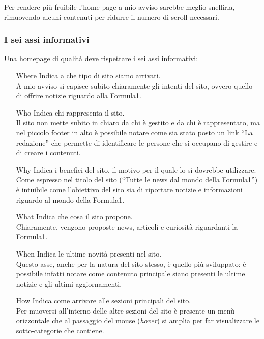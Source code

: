 Per rendere più fruibile l'home page a mio avviso sarebbe meglio snellirla,
rimuovendo alcuni contenuti per ridurre il numero di scroll necessari.

\subsubsection{I sei assi informativi}

Una homepage di qualit\`a deve rispettare i sei assi informativi:
\begin{itemize}

\item[Where] Indica a che tipo di sito siamo arrivati. \\
  A mio avviso si capisce subito chiaramente gli intenti del sito, ovvero quello
  di offrire notizie riguardo alla Formula1.

\item[Who] Indica chi rappresenta il sito. \\
  Il sito non mette subito in chiaro da chi \`e gestito e da chi \`e
  rappresentato, ma nel piccolo footer in alto \`e possibile notare come sia
  stato posto un link ``La redazione'' che permette di identificare le persone
  che si occupano di gestire e di creare i contenuti.

\item[Why] Indica i benefici del sito, il motivo per il quale lo si dovrebbe
  utilizzare. \\
  Come espresso nel titolo del sito (``Tutte le news dal mondo della Formula1'')
  \`e intuibile come l'obiettivo del sito sia di riportare notizie e
  informazioni riguardo al mondo della Formula1.

\item[What] Indica che cosa il sito propone. \\
  Chiaramente, vengono proposte news, articoli e curiosit\`a riguardanti la
  Formula1.

\item[When] Indica le ultime novit\`a presenti nel sito. \\
  Questo asse, anche per la natura del sito stesso, \`e quello pi\`u sviluppato:
  \`e possibile infatti notare come contenuto principale siano presenti le
  ultime notizie e gli ultimi aggiornamenti.

\item[How] Indica come arrivare alle sezioni principali del sito. \\
  Per muoversi all'interno delle altre sezioni del sito \`e presente un men\`u
  orizzontale che al passaggio del mouse (\textit{hover}) si amplia per far
  visualizzare le sotto-categorie che contiene.
  
  
\end{itemize}
